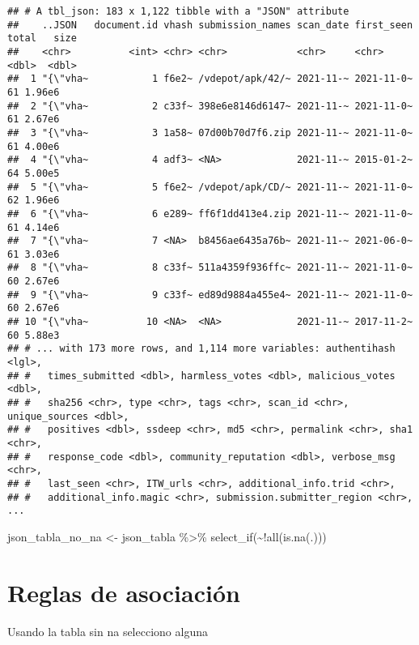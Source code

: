 \documentclass[
]{book}
\newenvironment{Shaded}{\begin{snugshade}}{\end{snugshade}}
\newcommand{\FunctionTok}[1]{\textcolor[rgb]{0.00,0.00,0.00}{#1}}
\newcommand{\NormalTok}[1]{#1}
\newcommand{\OtherTok}[1]{\textcolor[rgb]{0.56,0.35,0.01}{#1}}
\newcommand{\SpecialCharTok}[1]{\textcolor[rgb]{0.00,0.00,0.00}{#1}}
\begin{document}
\begin{verbatim}
## # A tbl_json: 183 x 1,122 tibble with a "JSON" attribute
##    ..JSON   document.id vhash submission_names scan_date first_seen total   size
##    <chr>          <int> <chr> <chr>            <chr>     <chr>      <dbl>  <dbl>
##  1 "{\"vha~           1 f6e2~ /vdepot/apk/42/~ 2021-11-~ 2021-11-0~    61 1.96e6
##  2 "{\"vha~           2 c33f~ 398e6e8146d6147~ 2021-11-~ 2021-11-0~    61 2.67e6
##  3 "{\"vha~           3 1a58~ 07d00b70d7f6.zip 2021-11-~ 2021-11-0~    61 4.00e6
##  4 "{\"vha~           4 adf3~ <NA>             2021-11-~ 2015-01-2~    64 5.00e5
##  5 "{\"vha~           5 f6e2~ /vdepot/apk/CD/~ 2021-11-~ 2021-11-0~    62 1.96e6
##  6 "{\"vha~           6 e289~ ff6f1dd413e4.zip 2021-11-~ 2021-11-0~    61 4.14e6
##  7 "{\"vha~           7 <NA>  b8456ae6435a76b~ 2021-11-~ 2021-06-0~    61 3.03e6
##  8 "{\"vha~           8 c33f~ 511a4359f936ffc~ 2021-11-~ 2021-11-0~    60 2.67e6
##  9 "{\"vha~           9 c33f~ ed89d9884a455e4~ 2021-11-~ 2021-11-0~    60 2.67e6
## 10 "{\"vha~          10 <NA>  <NA>             2021-11-~ 2017-11-2~    60 5.88e3
## # ... with 173 more rows, and 1,114 more variables: authentihash <lgl>,
## #   times_submitted <dbl>, harmless_votes <dbl>, malicious_votes <dbl>,
## #   sha256 <chr>, type <chr>, tags <chr>, scan_id <chr>, unique_sources <dbl>,
## #   positives <dbl>, ssdeep <chr>, md5 <chr>, permalink <chr>, sha1 <chr>,
## #   response_code <dbl>, community_reputation <dbl>, verbose_msg <chr>,
## #   last_seen <chr>, ITW_urls <chr>, additional_info.trid <chr>,
## #   additional_info.magic <chr>, submission.submitter_region <chr>, ...
\end{verbatim}

\begin{Shaded}
\begin{Highlighting}[]
\NormalTok{json\_tabla\_no\_na }\OtherTok{\textless{}{-}}\NormalTok{ json\_tabla }\SpecialCharTok{\%\textgreater{}\%} \FunctionTok{select\_if}\NormalTok{(}\SpecialCharTok{\textasciitilde{}!}\FunctionTok{all}\NormalTok{(}\FunctionTok{is.na}\NormalTok{(.)))}
\end{Highlighting}
\end{Shaded}

\hypertarget{reglas-de-asociaciuxf3n}{%
\chapter{Reglas de asociación}\label{reglas-de-asociaciuxf3n}}

Usando la tabla sin na selecciono alguna
\end{document}

